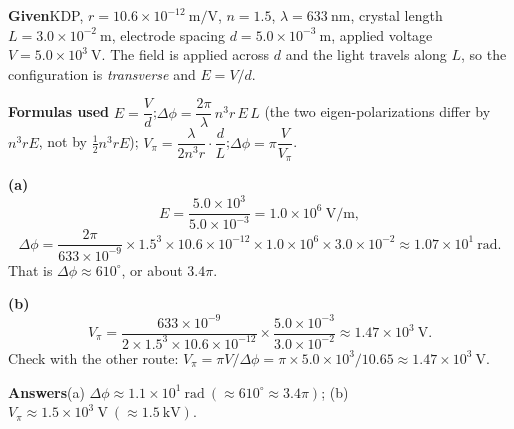 \documentclass[11pt]{ctexart}
\let\subhdrtheme\subhdr
\renewcommand{\subhdr}[1]{\needspace{3\baselineskip}\subhdrtheme{#1}}
\begin{document}
\textbf{Given}\quad KDP, $r=10.6\times10^{-12}\ \mathrm{m/V}$, $n=1.5$, $\lambda=633\ \mathrm{nm}$,
crystal length $L=3.0\times10^{-2}\ \mathrm{m}$, electrode spacing $d=5.0\times10^{-3}\ \mathrm{m}$,
applied voltage $V=5.0\times10^{3}\ \mathrm{V}$. The field is applied across $d$ and the light travels along
$L$, so the configuration is \emph{transverse} and $E=V/d$.

\textbf{Formulas used}\quad
$E=\dfrac{V}{d}$;\quad $\Delta\phi=\dfrac{2\pi}{\lambda}\,n^{3}r\,E\,L$\quad
(the two eigen-polarizations differ by $n^{3}rE$, not by $\tfrac12 n^{3}rE$);\quad
$V_\pi=\dfrac{\lambda}{2n^{3}r}\cdot\dfrac{d}{L}$;\quad $\Delta\phi=\pi\dfrac{V}{V_\pi}$.

\textbf{(a)}
\begin{equation}
E=\frac{5.0\times10^{3}}{5.0\times10^{-3}}=1.0\times10^{6}\ \mathrm{V/m},
\end{equation}
\begin{equation}
\Delta\phi=\frac{2\pi}{633\times10^{-9}}\times1.5^{3}\times10.6\times10^{-12}\times1.0\times10^{6}\times3.0\times10^{-2}
\approx1.07\times10^{1}\ \mathrm{rad}.
\end{equation}
That is $\Delta\phi\approx610^\circ$, or about $3.4\pi$.

\textbf{(b)}
\begin{equation}
V_\pi=\frac{633\times10^{-9}}{2\times1.5^{3}\times10.6\times10^{-12}}\times\frac{5.0\times10^{-3}}{3.0\times10^{-2}}
\approx1.47\times10^{3}\ \mathrm{V}.
\end{equation}
Check with the other route: $V_\pi=\pi V/\Delta\phi=\pi\times5.0\times10^{3}/10.65\approx1.47\times10^{3}\ \mathrm{V}$.

\textbf{Answers}\quad (a) $\Delta\phi\approx1.1\times10^{1}\ \mathrm{rad}\ (\approx610^\circ\approx3.4\pi)$;\quad
(b) $V_\pi\approx1.5\times10^{3}\ \mathrm{V}\ (\approx1.5\ \mathrm{kV})$.


\end{document}
